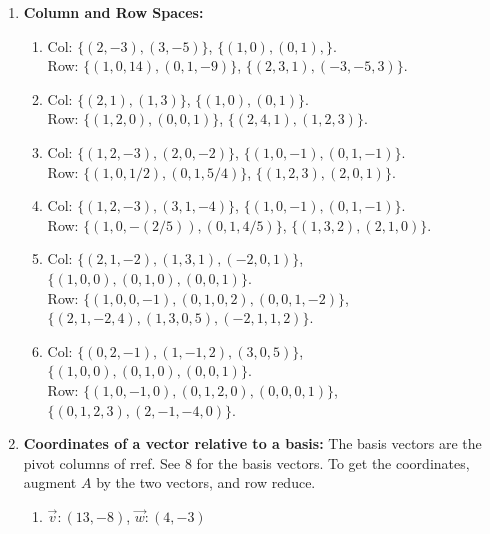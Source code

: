 {\begin{multicols}{2}
\begin{enumerate}
\begin{enumerate}
\end{enumerate}







\item  {\bf Column and Row Spaces:} 

\begin{enumerate}
\item Col: 
$\{  (2, -3), (3, -5)  \}$,
$\{  (1, 0), (0, 1),  \}$.
\\Row:
$\{  (1, 0, 14), (0, 1, -9)  \}$,
$\{  (2, 3, 1), (-3, -5, 3)  \}$.

\item Col: 
$ \{  (2, 1),  (1, 3)  \} $,
$ \{  (1, 0), (0, 1)  \} $.
\\Row:
$ \{  (1, 2, 0), (0, 0, 1)  \} $,
$ \{  (2, 4, 1), (1, 2, 3)  \} $.

\item Col: 
$ \{  (1, 2, -3), (2, 0, -2)  \} $,
$ \{  (1, 0, -1), (0, 1, -1)  \} $.
\\Row:
$ \{  (1, 0, 1/2), (0, 1, 5/4) \} $,
$ \{  (1, 2, 3), (2, 0, 1)  \} $.

\item Col: 
$ \{  (1, 2, -3), (3, 1, -4)  \} $,
$ \{  (1, 0, -1), (0, 1, -1)  \} $.
\\Row:
$ \{  (1, 0, -(2/5)), (0, 1, 4/5)  \} $,
$ \{  (1, 3, 2), (2, 1, 0) \} $.

\item Col: 
$ \{  (2, 1, -2), (1, 3, 1), (-2, 0, 1) \} $,
$ \{  (1, 0, 0), (0, 1, 0), (0, 0, 1)  \} $.
\\Row:
$ \{  (1, 0, 0, -1), (0, 1, 0, 2), (0, 0, 1, -2)  \} $,
$ \{  (2, 1, -2, 4), (1, 3, 0, 5), (-2, 1, 1, 2)  \} $.

\item Col: 
$ \{  (0, 2, -1), (1, -1, 2), (3, 0, 5)  \} $,
$ \{  (1, 0, 0), (0, 1, 0), (0, 0, 1)  \} $.
\\Row:
$ \{  (1, 0, -1, 0), (0, 1, 2, 0), (0, 0, 0, 1)  \} $,
$ \{  (0, 1, 2, 3), (2, -1, -4, 0) \} $.

\end{enumerate}


\item  {\bf Coordinates of a vector relative to a basis:} The basis vectors are the pivot columns of rref. See 8 for the basis vectors. To get the coordinates, augment $A$ by the two vectors, and row reduce. 
\begin{enumerate}
\item  
$\vec v: (13, -8)$,
$\vec w: (4, -3) $


\end{enumerate}
\end{enumerate}
\end{multicols}}
